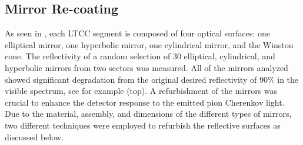 \subsection{Mirror Re-coating}

As seen in , each LTCC segment is composed of four optical surfaces: one elliptical mirror,
one hyperbolic mirror, one cylindrical mirror, and the Winston cone.
The reflectivity of a random selection of 30 elliptical, cylindrical, and hyperbolic mirrors from two sectors was measured.
All of the mirrors analyzed showed significant degradation from the original desired reflectivity of 90$\%$ in the visible spectrum,
see for example  (top).
A refurbishment of the mirrors was crucial to enhance the detector response to the emitted pion Cherenkov light.
Due to the material, assembly, and dimensions of the different types of mirrors, two different techniques were employed to refurbish the
reflective surfaces as discussed below.

